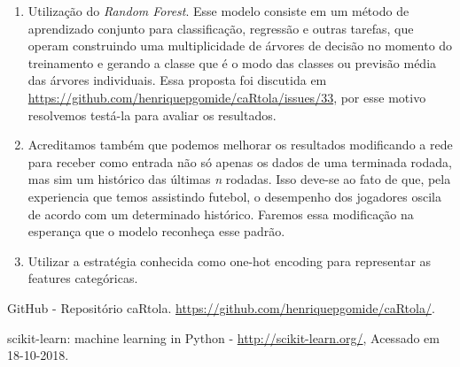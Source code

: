 \documentclass[conference]{IEEEtran}
\begin{document}
\begin{enumerate}

\item Utilização do \textit{Random  Forest}. Esse modelo consiste em
um método  de aprendizado  conjunto para  classificação, regressão
e  outras  tarefas,  que  operam  construindo  uma  multiplicidade  de
árvores  de   decisão  no  momento   do  treinamento  e   gerando  a
classe   que   é   o   modo   das   classes   ou   previsão   média
das   árvores   individuais.   Essa   proposta   foi   discutida   em
\url{https://github.com/henriquepgomide/caRtola/issues/33},  por  esse
motivo resolvemos testá-la para avaliar os resultados.

\item  Acreditamos   também  que   podemos  melhorar   os  resultados
modificando a rede para receber como  entrada não só apenas os dados
de uma terminada rodada, mas sim um histórico das últimas \textit{n}
rodadas.  Isso deve-se  ao fato  de  que, pela  experiencia que  temos
assistindo futebol, o desempenho dos jogadores oscila de acordo com um
determinado histórico. Faremos essa modificação na esperança que o
modelo reconheça esse padrão.

\item  Utilizar a  estratégia  conhecida como  one-hot encoding  para
representar as features categóricas.

\end{enumerate}

\begin{thebibliography}{00}

      GitHub     -      Repositório     caRtola.
\url{https://github.com/henriquepgomide/caRtola/}.

  scikit-learn:  machine  learning in  Python  -
\url{http://scikit-learn.org/}, Acessado em 18-10-2018.

\end{thebibliography}
\end{document}
